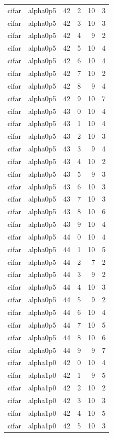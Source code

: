 \begin{tabular}{llrrrr}
cifar & alpha0p5 & 42 & 2 & 10 & 3 \\
cifar & alpha0p5 & 42 & 3 & 10 & 3 \\
cifar & alpha0p5 & 42 & 4 & 9 & 2 \\
cifar & alpha0p5 & 42 & 5 & 10 & 4 \\
cifar & alpha0p5 & 42 & 6 & 10 & 4 \\
cifar & alpha0p5 & 42 & 7 & 10 & 2 \\
cifar & alpha0p5 & 42 & 8 & 9 & 4 \\
cifar & alpha0p5 & 42 & 9 & 10 & 7 \\
cifar & alpha0p5 & 43 & 0 & 10 & 4 \\
cifar & alpha0p5 & 43 & 1 & 10 & 4 \\
cifar & alpha0p5 & 43 & 2 & 10 & 3 \\
cifar & alpha0p5 & 43 & 3 & 9 & 4 \\
cifar & alpha0p5 & 43 & 4 & 10 & 2 \\
cifar & alpha0p5 & 43 & 5 & 9 & 3 \\
cifar & alpha0p5 & 43 & 6 & 10 & 3 \\
cifar & alpha0p5 & 43 & 7 & 10 & 3 \\
cifar & alpha0p5 & 43 & 8 & 10 & 6 \\
cifar & alpha0p5 & 43 & 9 & 10 & 4 \\
cifar & alpha0p5 & 44 & 0 & 10 & 4 \\
cifar & alpha0p5 & 44 & 1 & 10 & 5 \\
cifar & alpha0p5 & 44 & 2 & 7 & 2 \\
cifar & alpha0p5 & 44 & 3 & 9 & 2 \\
cifar & alpha0p5 & 44 & 4 & 10 & 3 \\
cifar & alpha0p5 & 44 & 5 & 9 & 2 \\
cifar & alpha0p5 & 44 & 6 & 10 & 4 \\
cifar & alpha0p5 & 44 & 7 & 10 & 5 \\
cifar & alpha0p5 & 44 & 8 & 10 & 6 \\
cifar & alpha0p5 & 44 & 9 & 9 & 7 \\
cifar & alpha1p0 & 42 & 0 & 10 & 4 \\
cifar & alpha1p0 & 42 & 1 & 9 & 5 \\
cifar & alpha1p0 & 42 & 2 & 10 & 2 \\
cifar & alpha1p0 & 42 & 3 & 10 & 3 \\
cifar & alpha1p0 & 42 & 4 & 10 & 5 \\
cifar & alpha1p0 & 42 & 5 & 10 & 3 \\

\end{tabular}
